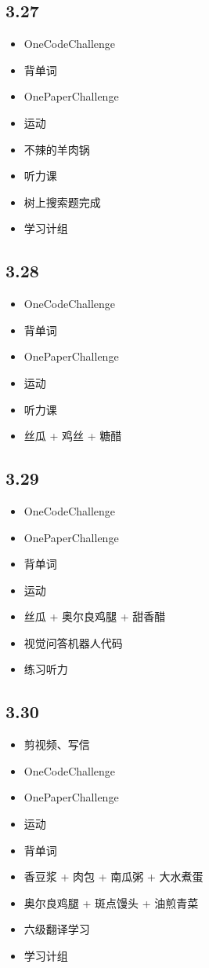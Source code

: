 \documentclass[UTF8]{ctexart}
\begin{document}
\subsection*{3.27}
\begin{itemize}
    \item OneCodeChallenge
    \item 背单词
    \item OnePaperChallenge
    \item 运动
    \item 不辣的羊肉锅
    \item 听力课
    \item 树上搜索题完成
    \item 学习计组
\end{itemize}

\subsection*{3.28}
\begin{itemize}
    \item OneCodeChallenge
    \item 背单词
    \item OnePaperChallenge
    \item 运动
    \item 听力课
    \item 丝瓜 + 鸡丝 + 糖醋
\end{itemize}

\subsection*{3.29}
\begin{itemize}
    \item OneCodeChallenge
    \item OnePaperChallenge
    \item 背单词
    \item 运动
    \item 丝瓜 + 奥尔良鸡腿 + 甜香醋
    \item 视觉问答机器人代码
    \item 练习听力
\end{itemize}

\subsection*{3.30}
\begin{itemize}
    \item 剪视频、写信
    \item OneCodeChallenge
    \item OnePaperChallenge
    \item 运动
    \item 背单词
    \item 香豆浆 + 肉包 + 南瓜粥 + 大水煮蛋
    \item 奥尔良鸡腿 + 斑点馒头 + 油煎青菜
    \item 六级翻译学习
    \item 学习计组
\end{itemize}
\end{document}
